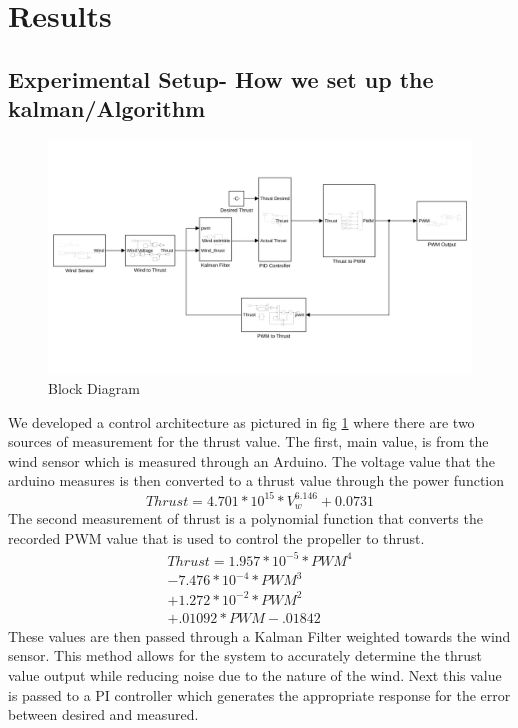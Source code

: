 \documentclass[conference]{IEEEtran}
\begin{document}
	\section{Results}
	\subsection{Experimental Setup- How we set up the kalman/Algorithm}
	\begin{figure}[]
		\includegraphics[width=\textwidth]{block_diagram}
		\caption{Block Diagram}
		\label{block_diagram}
	\end{figure}
	We developed a control architecture as pictured in fig \ref{block_diagram} where there are two sources of measurement for the thrust value. The first, main value, is from the wind sensor which is measured through an Arduino. The voltage value that the arduino measures is then converted to a thrust value through the power function
	\begin{equation}
	Thrust = 4.701 * 10^{15} * V_w^{6.146} + 0.0731
	\label{wind_power}
	\end{equation}
	The second measurement of thrust is a polynomial function that converts the recorded PWM value that is used to control the propeller to thrust. \newline
	\begin{eqnarray}
	Thrust = 1.957*10^{-5}*PWM^4 \\
	- 7.476*10^{-4}*PWM^3 \nonumber\\ 
	+ 1.272*10^{-2}*PWM^2 \nonumber\\
	+ .01092*PWM - .01842 \nonumber
	\label{pwm_poly}
	\end{eqnarray}
	These values are then passed through a Kalman Filter weighted towards the wind sensor. This method allows for the system to accurately determine the thrust value output while reducing noise due to the nature of the wind. Next this value is passed to a PI controller which generates the appropriate response for the error between desired and measured. 
\end{document}
